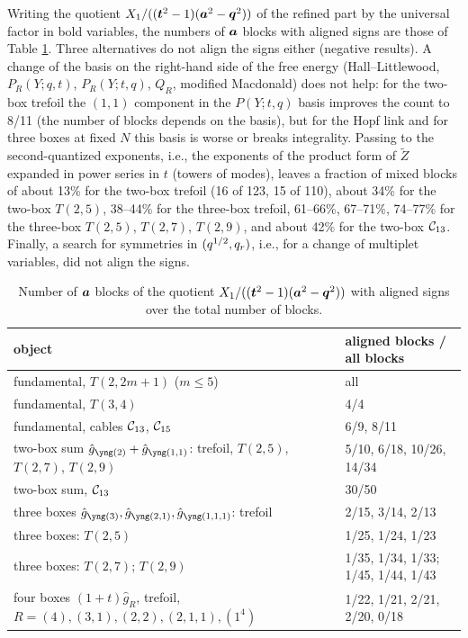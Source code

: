 \begin{result}\label{cr:signs}
Writing the quotient $X_1/((\bm{t}^2-1)(\bm{a}^2-\bm{q}^2))$ of the refined part by the universal factor in bold variables, the numbers of $\bm{a}$ blocks with aligned signs are those of Table \ref{tab:signs}. Three alternatives do not align the signs either (negative results). A change of the basis on the right-hand side of the free energy (Hall--Littlewood, $P_R(Y; q, t)$, $P_R(Y; t, q)$, $Q_R$, modified Macdonald) does not help: for the two-box trefoil the $(1,1)$ component in the $P(Y;t,q)$ basis improves the count to 8/11 (the number of blocks depends on the basis), but for the Hopf link and for three boxes at fixed $N$ this basis is worse or breaks integrality.
Passing to the second-quantized exponents, i.e., the exponents of the product form of $\tilde Z$ expanded in power series in $t$ (towers of modes), leaves a fraction of mixed blocks of about 13\% for the two-box trefoil (16 of 123, 15 of 110), about 34\% for the two-box $T(2,5)$, 38--44\% for the three-box trefoil, 61--66\%, 67--71\%, 74--77\% for the three-box $T(2,5)$, $T(2,7)$, $T(2,9)$, and about 42\% for the two-box $\mathcal{C}_{13}$.
Finally, a search for symmetries in $(q^{1/2}, q_r)$, i.e., for a change of multiplet variables, did not align the signs.
\end{result}
\begin{table}[htbp]
\centering
\caption{Number of $\bm{a}$ blocks of the quotient $X_1/((\bm{t}^2-1)(\bm{a}^2-\bm{q}^2))$ with aligned signs over the total number of blocks.}\label{tab:signs}
\footnotesize
\begin{tabular}{ll}
\toprule
object & aligned blocks / all blocks \\
\midrule
fundamental, $T(2,2m+1)$ ($m \le 5$) & all \\
fundamental, $T(3,4)$ & 4/4 \\
fundamental, cables $\mathcal{C}_{13}$, $\mathcal{C}_{15}$ & 6/9, 8/11 \\
two-box sum $\hat g_{\ytwo} + \hat g_{\yoneone}$: trefoil, $T(2,5)$, $T(2,7)$, $T(2,9)$ & 5/10, 6/18, 10/26, 14/34 \\
two-box sum, $\mathcal{C}_{13}$ & 30/50 \\
three boxes $\hat g_{\ythree}, \hat g_{\ytwoone}, \hat g_{\yoneoneone}$: trefoil & 2/15, 3/14, 2/13 \\
three boxes: $T(2,5)$ & 1/25, 1/24, 1/23 \\
three boxes: $T(2,7)$; $T(2,9)$ & 1/35, 1/34, 1/33; 1/45, 1/44, 1/43 \\
four boxes $(1+t)\hat g_R$, trefoil, $R = (4), (3,1), (2,2), (2,1,1), (1^4)$ & 1/22, 1/21, 2/21, 2/20, 0/18 \\
\bottomrule
\end{tabular}
\end{table}
